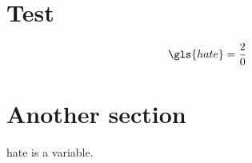 \documentclass{article}
\numberwithin{equation}{section}
\begin{document}
\section{Test}
\begin{equation}
 \gls{hate} = \frac{2}{0}
\end{equation}
\newpage


\section{Another section}\label{sec:sec2}
\Gls{hate} is a variable.

\printglossary[style=mylong3col,type=main]
\end{document}
